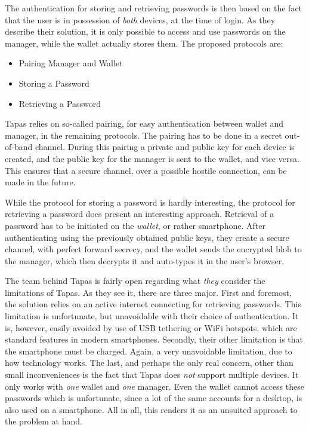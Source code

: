 			The authentication for storing and retrieving passwords is then based on the fact that the user is in possession of \emph{both} devices, at the time of login. As they describe their solution, it is only possible to access and use passwords on the manager, while the wallet actually stores them. The proposed protocols are:
			\begin{itemize}
				\item Pairing Manager and Wallet
				\item Storing a Password
				\item Retrieving a Password
			\end{itemize}

			Tapas relies on so-called pairing, for easy authentication between wallet and manager, in the remaining protocols. The pairing has to be done in a secret out-of-band channel. During this pairing a private and public key for each device is created, and the public key for the manager is sent to the wallet, and vice versa. This ensures that a secure channel, over a possible hostile connection, can be made in the future.

			While the protocol for storing a password is hardly interesting, the protocol for retrieving a password does present an interesting approach. Retrieval of a password has to be initiated on the \emph{wallet}, or rather smartphone. After authenticating using the previously obtained public keys, they create a secure channel, with perfect forward secrecy, and the wallet sends the encrypted blob to the manager, which then decrypts it and auto-types it in the user's browser.

			The team behind Tapas is fairly open regarding what \emph{they} consider the limitations of Tapas. As they see it, there are three major. First and foremost, the solution relies on an active internet connecting for retrieving passwords. This limitation is unfortunate, but unavoidable with their choice of authentication. It is, however, easily avoided by use of USB tethering or WiFi hotspots, which are standard features in modern smartphones. Secondly, their other limitation is that the smartphone must be charged. Again, a very unavoidable limitation, due to how technology works. The last, and perhaps the only real concern, other than small inconveniences is the fact that Tapas does \emph{not} support multiple devices. It only works with \emph{one} wallet and  \emph{one} manager. Even the wallet cannot access these passwords which is unfortunate, since a lot of the same accounts for a desktop, is also used on a smartphone. All in all, this renders it as an unsuited approach to the problem at hand.

